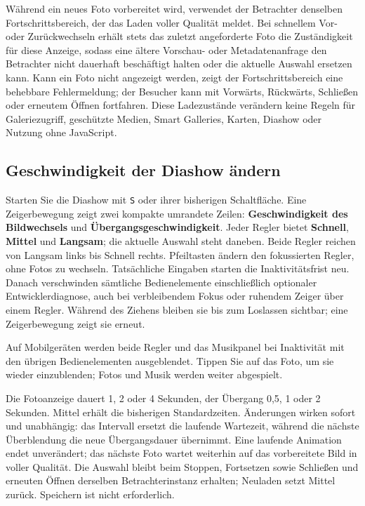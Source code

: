 \documentclass[11pt,a4paper]{article}
\newcommand{\ui}[1]{\textbf{#1}}
\newcommand{\codeword}[1]{\nolinkurl{#1}}
\begin{document}
Während ein neues Foto vorbereitet wird, verwendet der Betrachter denselben
Fortschrittsbereich, der das Laden voller Qualität meldet. Bei schnellem Vor-
oder Zurückwechseln erhält stets das zuletzt angeforderte Foto die Zuständigkeit
für diese Anzeige, sodass eine ältere Vorschau- oder Metadatenanfrage den
Betrachter nicht dauerhaft beschäftigt halten oder die aktuelle Auswahl ersetzen
kann. Kann ein Foto nicht angezeigt werden, zeigt der Fortschrittsbereich eine
behebbare Fehlermeldung; der Besucher kann mit Vorwärts, Rückwärts, Schließen
oder erneutem Öffnen fortfahren. Diese Ladezustände verändern keine Regeln für
Galeriezugriff, geschützte Medien, Smart Galleries, Karten, Diashow oder Nutzung
ohne JavaScript.

\subsection{Geschwindigkeit der Diashow ändern}

Starten Sie die Diashow mit \codeword{S} oder ihrer bisherigen Schaltfläche.
Eine Zeigerbewegung zeigt zwei kompakte umrandete Zeilen: \ui{Geschwindigkeit
des Bildwechsels} und \ui{Übergangsgeschwindigkeit}. Jeder Regler bietet
\ui{Schnell}, \ui{Mittel} und \ui{Langsam}; die aktuelle Auswahl steht daneben.
Beide Regler reichen von Langsam links bis Schnell rechts. Pfeiltasten ändern
den fokussierten Regler, ohne Fotos zu wechseln. Tatsächliche Eingaben starten
die Inaktivitätsfrist neu. Danach verschwinden sämtliche Bedienelemente
einschließlich optionaler Entwicklerdiagnose, auch bei verbleibendem Fokus oder
ruhendem Zeiger über einem Regler. Während des Ziehens bleiben sie bis zum
Loslassen sichtbar; eine Zeigerbewegung zeigt sie erneut.

Auf Mobilgeräten werden beide Regler und das Musikpanel bei Inaktivität mit
den übrigen Bedienelementen ausgeblendet. Tippen Sie auf das Foto, um sie
wieder einzublenden; Fotos und Musik werden weiter abgespielt.

Die Fotoanzeige dauert 1, 2 oder 4 Sekunden, der Übergang 0,5, 1 oder 2
Sekunden. Mittel erhält die bisherigen Standardzeiten. Änderungen wirken sofort
und unabhängig: das Intervall ersetzt die laufende Wartezeit, während die
nächste Überblendung die neue Übergangsdauer übernimmt. Eine laufende Animation
endet unverändert; das nächste Foto wartet weiterhin auf das vorbereitete Bild
in voller Qualität. Die Auswahl bleibt beim Stoppen, Fortsetzen sowie Schließen
und erneuten Öffnen derselben Betrachterinstanz erhalten; Neuladen setzt Mittel
zurück. Speichern ist nicht erforderlich.
\end{document}
